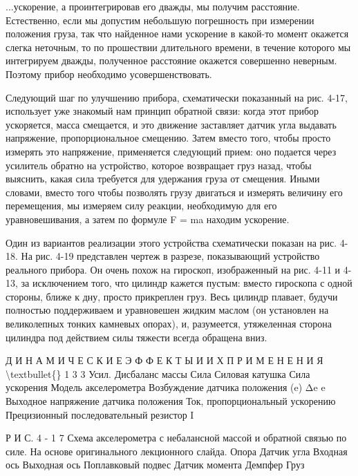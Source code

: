 \documentclass[10pt,oneside]{article}
\begin{document}
...ускорение, а проинтегрировав его дважды, мы получим расстояние. Естественно, если мы допустим небольшую погрешность при измерении положения груза, так что найденное нами ускорение в какой-то момент окажется слегка неточным, то по прошествии длительного времени, в течение которого мы интегрируем дважды, полученное расстояние окажется совершенно неверным. Поэтому прибор необходимо усовершенствовать.\par

Следующий шаг по улучшению прибора, схематически показанный на рис. 4-17, использует уже знакомый нам принцип обратной связи: когда этот прибор ускоряется, масса смещается, и это движение заставляет датчик угла выдавать напряжение, пропорциональное смещению. Затем вместо того, чтобы просто измерять это напряжение, применяется следующий прием: оно подается через усилитель обратно на устройство, которое возвращает груз назад, чтобы выяснить, какая сила требуется для удержания груза от смещения. Иными словами, вместо того чтобы позволять грузу двигаться и измерять величину его перемещения, мы измеряем силу реакции, необходимую для его уравновешивания, а затем по формуле F = ma находим ускорение.\par

Один из вариантов реализации этого устройства схематически показан на рис. 4-18. На рис. 4-19 представлен чертеж в разрезе, показывающий устройство реального прибора. Он очень похож на гироскоп, изображенный на рис. 4-11 и 4-13, за исключением того, что цилиндр кажется пустым: вместо гироскопа с одной стороны, ближе к дну, просто прикреплен груз. Весь цилиндр плавает, будучи полностью поддерживаем и уравновешен жидким маслом (он установлен на великолепных тонких камневых опорах), и, разумеется, утяжеленная сторона цилиндра под действием силы тяжести всегда обращена вниз.\par

Д И Н А М И Ч Е С К И Е  Э Ф Ф Е К Т Ы  И  И Х  П Р И М Е Н Е Н И Я \textbackslash{}textbullet\{\} 1 3 3 Усил. Дисбаланс массы Сила Силовая катушка Сила ускорения Модель акселерометра Возбуждение датчика положения (e) Δe e Выходное напряжение датчика положения Ток, пропорциональный ускорению Прецизионный последовательный резистор I\par

Р И С.  4 - 1 7 Схема акселерометра с небалансной массой и обратной связью по силе. На основе оригинального лекционного слайда. Опора Датчик угла Входная ось Выходная ось Поплавковый подвес Датчик момента Демпфер Груз\par
\end{document}
